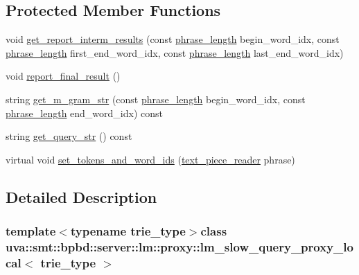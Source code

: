 \subsection*{Protected Member Functions}
\begin{DoxyCompactItemize}
\item 
void \hyperlink{classuva_1_1smt_1_1bpbd_1_1server_1_1lm_1_1proxy_1_1lm__slow__query__proxy__local_ad94e55d741055b8545aa02354718a01e}{get\+\_\+report\+\_\+interm\+\_\+results} (const \hyperlink{namespaceuva_1_1smt_1_1bpbd_1_1server_af068a19c2e03116caf3e3827a3e40e35}{phrase\+\_\+length} begin\+\_\+word\+\_\+idx, const \hyperlink{namespaceuva_1_1smt_1_1bpbd_1_1server_af068a19c2e03116caf3e3827a3e40e35}{phrase\+\_\+length} first\+\_\+end\+\_\+word\+\_\+idx, const \hyperlink{namespaceuva_1_1smt_1_1bpbd_1_1server_af068a19c2e03116caf3e3827a3e40e35}{phrase\+\_\+length} last\+\_\+end\+\_\+word\+\_\+idx)
\item 
void \hyperlink{classuva_1_1smt_1_1bpbd_1_1server_1_1lm_1_1proxy_1_1lm__slow__query__proxy__local_ab320656eb37e9057c42a259b7289f800}{report\+\_\+final\+\_\+result} ()
\item 
string \hyperlink{classuva_1_1smt_1_1bpbd_1_1server_1_1lm_1_1proxy_1_1lm__slow__query__proxy__local_af7e8073bec1f9ab4364cd14b85055d94}{get\+\_\+m\+\_\+gram\+\_\+str} (const \hyperlink{namespaceuva_1_1smt_1_1bpbd_1_1server_af068a19c2e03116caf3e3827a3e40e35}{phrase\+\_\+length} begin\+\_\+word\+\_\+idx, const \hyperlink{namespaceuva_1_1smt_1_1bpbd_1_1server_af068a19c2e03116caf3e3827a3e40e35}{phrase\+\_\+length} end\+\_\+word\+\_\+idx) const 
\item 
string \hyperlink{classuva_1_1smt_1_1bpbd_1_1server_1_1lm_1_1proxy_1_1lm__slow__query__proxy__local_a0b7439f8f17bda502a37a9932918eeee}{get\+\_\+query\+\_\+str} () const 
\item 
virtual void \hyperlink{classuva_1_1smt_1_1bpbd_1_1server_1_1lm_1_1proxy_1_1lm__slow__query__proxy__local_aa05aa09a1d360c17b94aeea2f2a42e24}{set\+\_\+tokens\+\_\+and\+\_\+word\+\_\+ids} (\hyperlink{classuva_1_1utils_1_1file_1_1text__piece__reader}{text\+\_\+piece\+\_\+reader} phrase)
\end{DoxyCompactItemize}


\subsection{Detailed Description}
\subsubsection*{template$<$typename trie\+\_\+type$>$class uva\+::smt\+::bpbd\+::server\+::lm\+::proxy\+::lm\+\_\+slow\+\_\+query\+\_\+proxy\+\_\+local$<$ trie\+\_\+type $>$}

